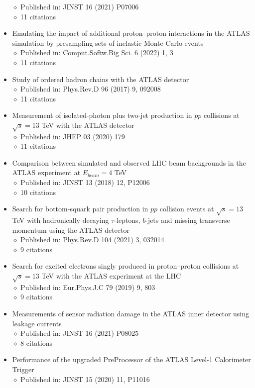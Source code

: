 \documentclass[margin, 10pt]{res} %
\begin{document}
\begin{resume}
\begin{itemize}
$\diamond$ Published in: JINST 16 (2021) P07006\\
$\diamond$ 11 citations
\item Emulating the impact of additional proton–proton interactions in the ATLAS simulation by presampling sets of inelastic Monte Carlo events\\
$\diamond$ Published in: Comput.Softw.Big Sci. 6 (2022) 1, 3\\
$\diamond$ 11 citations
\item Study of ordered hadron chains with the ATLAS detector\\
$\diamond$ Published in: Phys.Rev.D 96 (2017) 9, 092008\\
$\diamond$ 11 citations
\item Measurement of isolated-photon plus two-jet production in $pp$ collisions at $\sqrt{s} = 13$ TeV with the ATLAS detector\\
$\diamond$ Published in: JHEP 03 (2020) 179\\
$\diamond$ 11 citations
\item Comparison between simulated and observed LHC beam backgrounds in the ATLAS experiment at $E_{beam} = 4$ TeV\\
$\diamond$ Published in: JINST 13 (2018) 12, P12006\\
$\diamond$ 10 citations
\item Search for bottom-squark pair production in $pp$ collision events at $\sqrt{s} = 13$ TeV with hadronically decaying $\tau$-leptons, $b$-jets and missing transverse momentum using the ATLAS detector\\
$\diamond$ Published in: Phys.Rev.D 104 (2021) 3, 032014\\
$\diamond$ 9 citations
\item Search for excited electrons singly produced in proton–proton collisions at $\sqrt{s} = 13$ TeV with the ATLAS experiment at the LHC\\
$\diamond$ Published in: Eur.Phys.J.C 79 (2019) 9, 803\\
$\diamond$ 9 citations
\item Measurements of sensor radiation damage in the ATLAS inner detector using leakage currents\\
$\diamond$ Published in: JINST 16 (2021) P08025\\
$\diamond$ 8 citations
\item Performance of the upgraded PreProcessor of the ATLAS Level-1 Calorimeter Trigger\\
$\diamond$ Published in: JINST 15 (2020) 11, P11016\\

\end{itemize}
\end{resume}
\end{document}
